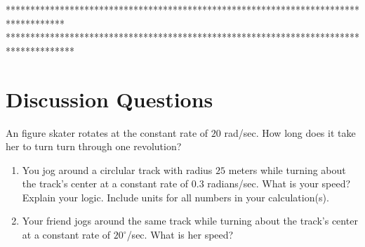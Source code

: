\documentclass{ximera}
\begin{document}
************************************************************************************
**************************************************************************************

\fi


\section{Discussion Questions}

\begin{question} \label{Qodfdstr43}
An figure skater rotates at the constant rate of $20$ rad/sec. How long does it take her to turn turn through one revolution?
\end{question}

\begin{question} \label{Q9df9sttr4rt}
\begin{enumerate}
\item You jog around a circlular track with radius $25$ meters while turning about the track's center at a constant rate of $0.3$ radians/sec. What is your speed? Explain your logic. Include units for all numbers in your calculation(s). 

\item Your friend jogs around the same track while turning about the track's center at a constant rate of $20^\circ$/sec. What is her speed?

\end{enumerate}
\end{question}
\end{document}
